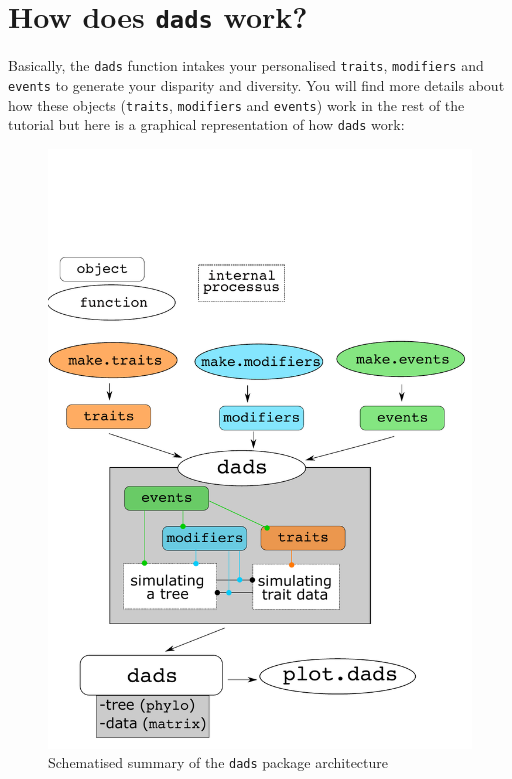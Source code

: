 \documentclass[]{book}
\begin{document}
\hypertarget{how-does-dads-work}{%
\section{\texorpdfstring{How does \texttt{dads} work?}{How does dads work?}}\label{how-does-dads-work}}

Basically, the \texttt{dads} function intakes your personalised \texttt{traits}, \texttt{modifiers} and \texttt{events} to generate your disparity and diversity.
You will find more details about how these objects (\texttt{traits}, \texttt{modifiers} and \texttt{events}) work in the rest of the tutorial but here is a graphical representation of how \texttt{dads} work:

\begin{figure}
\centering
\includegraphics{dads_structure.pdf}
\caption{Schematised summary of the \texttt{dads} package architecture}
\end{figure}
\end{document}
